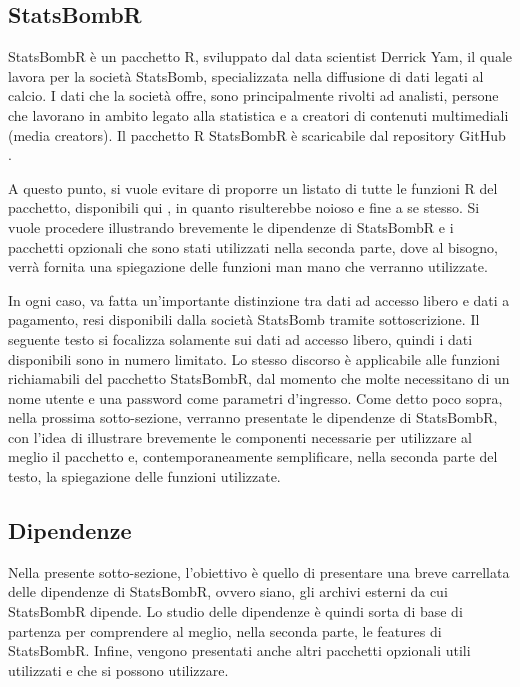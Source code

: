     \subsection{StatsBombR}
        StatsBombR è un pacchetto R, sviluppato dal data scientist Derrick Yam, il quale lavora per la società StatsBomb, specializzata nella diffusione di dati legati al calcio. I dati che la società offre, sono principalmente rivolti ad analisti, persone che lavorano in ambito legato alla statistica e a creatori di contenuti multimediali (media creators). Il pacchetto R StatsBombR è scaricabile dal repository GitHub \cite{StatsBombRGithub}.
        
        A questo punto, si vuole evitare di proporre un listato di tutte le funzioni R del pacchetto, disponibili qui \cite{funzioniR}, in quanto risulterebbe noioso e fine a se stesso. Si vuole procedere illustrando brevemente le dipendenze di StatsBombR e i pacchetti opzionali che sono stati utilizzati nella seconda parte, dove al bisogno, verrà fornita una spiegazione delle funzioni man mano che verranno utilizzate.
        
        In ogni caso, va fatta un'importante distinzione tra dati ad accesso libero e dati a pagamento, resi disponibili dalla società StatsBomb tramite sottoscrizione. Il seguente testo si focalizza solamente sui dati ad accesso libero, quindi i dati disponibili sono in numero limitato. Lo stesso discorso è applicabile alle funzioni richiamabili del pacchetto StatsBombR, dal momento che molte necessitano di un nome utente e una password come parametri d'ingresso. Come detto poco sopra, nella prossima sotto-sezione, verranno presentate le dipendenze di StatsBombR, con l'idea di illustrare brevemente le componenti necessarie per utilizzare al meglio il pacchetto e, contemporaneamente semplificare, nella seconda parte del testo, la spiegazione delle funzioni utilizzate.
        
    \subsection{Dipendenze}
        Nella presente sotto-sezione, l'obiettivo è quello di presentare una breve carrellata delle dipendenze di StatsBombR, ovvero siano, gli archivi esterni da cui StatsBombR dipende. Lo studio delle dipendenze è quindi sorta di base di partenza per comprendere al meglio, nella seconda parte, le features di StatsBombR. Infine, vengono presentati anche altri pacchetti opzionali utili utilizzati e che si possono utilizzare.

